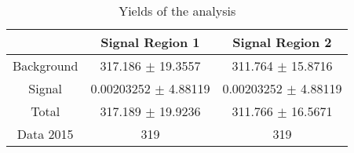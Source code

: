 \documentclass[10pt]{article}
\begin{document}
\begin{table}[htbp]
\begin{center}
\begin{tabular}{|c|c|c|}
\hline 
 & Signal Region 1 & Signal Region 2\\
\hline 
  Background   & \num[round-mode=figures,round-precision=3]{317.186} $\pm$ \num[round-mode=figures,round-precision=3]{19.3557} & \num[round-mode=figures,round-precision=3]{311.764} $\pm$ \num[round-mode=figures,round-precision=3]{15.8716} \\ 
  Signal   & \num[round-mode=figures,round-precision=3]{0.00203252} $\pm$ \num[round-mode=figures,round-precision=3]{4.88119} & \num[round-mode=figures,round-precision=3]{0.00203252} $\pm$ \num[round-mode=figures,round-precision=3]{4.88119} \\ 
\hline 
  Total  & \num[round-mode=figures,round-precision=3]{317.189} $\pm$ \num[round-mode=figures,round-precision=3]{19.9236} & \num[round-mode=figures,round-precision=3]{311.766} $\pm$ \num[round-mode=figures,round-precision=3]{16.5671} \\ 
\hline 
  Data 2015   & 319 & 319 \\ 
\hline 
\end{tabular} 
\caption{Yields of the analysis} 
\end{center} 
\end{table} 
\end{document}
